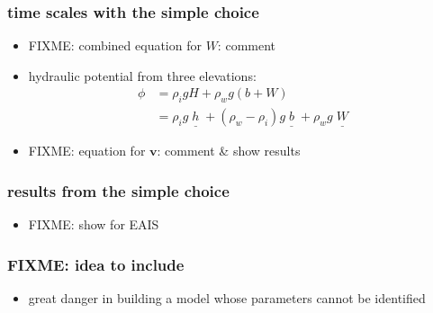 \documentclass[hide notes,intlimits]{beamer}
\begin{document}
\begin{frame}
  \frametitle{time scales with the simple choice}

  \begin{itemize}
    \item FIXME: combined equation for $W$: comment
    \item hydraulic potential from three elevations:
    \begin{align*}
      \phi &= \rho_i g H + \rho_w g (b+W) \\
           &= \rho_i g \underline{\phantom{|}h\phantom{|}} + (\rho_w - \rho_i) g \underline{\phantom{|}b\phantom{|}} + \rho_w g \underline{\phantom{|}W\phantom{|}}
    \end{align*}
    \item FIXME: equation for $\mathbf{v}$: comment \& show results
  \end{itemize}

\end{frame}


\begin{frame}
  \frametitle{results from the simple choice}

  \begin{itemize}
    \item FIXME: show for EAIS
  \end{itemize}

\end{frame}











\begin{frame}
  \frametitle{FIXME: idea to include}

  \begin{itemize}
  \item \alert{great danger} in building a model whose parameters cannot be identified
  \end{itemize}
\end{frame}
\end{document}
